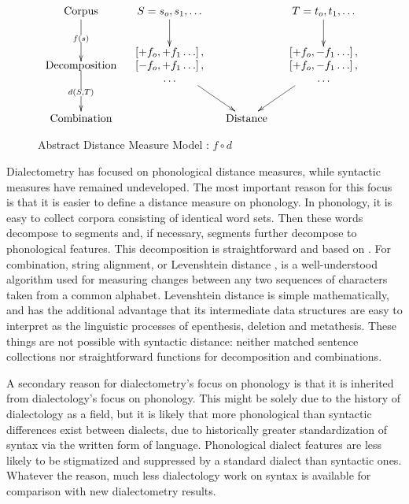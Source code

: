 \begin{figure}
\[\xymatrix@C=1pc{
 \textrm{Corpus} \ar@{>}[d]|{f(s)} &
  S = s_o,s_1,\ldots
  \ar@{>}[d] %
  &&
  T = t_o,t_1,\ldots
  \ar@{>}[d] %
  \\
 *\txt{Decomposition} \ar@{>}[d]|{d(S,T)} &
 *{\begin{array}{c}
     \left[ + f_o, +f_1 \ldots \right], \\
     \left[ - f_o, +f_1 \ldots \right], \\
     \ldots \\ \end{array}}
 \ar@{>}[dr]
 &&
 *{\begin{array}{c}
     \left[ + f_o, -f_1 \ldots \right], \\
     \left[ + f_o, -f_1 \ldots \right], \\
     \ldots \\ \end{array}}
 \ar@{>}[dl]  \\
 \textrm{Combination} &
 & \textrm{Distance} & \\
} \]
\label{abstract-distance-measure-model}
\caption{Abstract Distance Measure Model : $f \circ d$}
\end{figure}

Dialectometry has focused on phonological distance measures, while
syntactic measures have remained undeveloped. The most important
reason for this focus is that it is easier to define a distance
measure on phonology. In phonology, it is easy to collect corpora
consisting of identical word sets. Then these words decompose to segments and,
if necessary, segments further decompose to phonological
features. This decomposition is straightforward and based on
. For combination, string alignment, or Levenshtein
distance \cite{lev65}, is a well-understood algorithm used for
measuring changes between any two sequences of characters taken from a
common alphabet. Levenshtein distance is simple mathematically, and
has the additional advantage that its intermediate data structures are
easy to interpret as the linguistic processes of epenthesis, deletion and
metathesis. These things are not possible
with syntactic distance: neither matched sentence collections nor
straightforward functions for decomposition and combinations.

A secondary reason for dialectometry's focus on phonology is that it
is inherited from dialectology's focus on phonology.
This might be solely due to the history of dialectology as a field, but it is
likely that more phonological than syntactic differences exist between
dialects, due to historically greater standardization
of syntax via the written form of language. Phonological
dialect features are less likely to be stigmatized and suppressed by a
standard dialect than syntactic ones.
Whatever the reason, much less dialectology work on syntax is
available for comparison with new dialectometry results.

